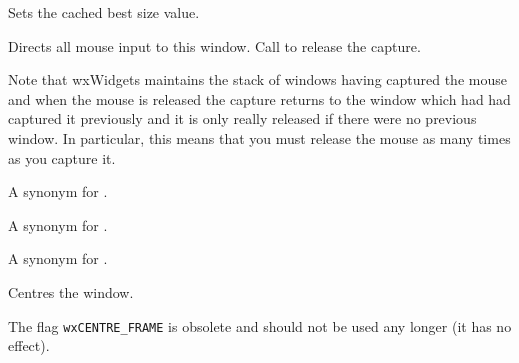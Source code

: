 
Sets the cached best size value.


\label{wxwindowcapturemouse}


Directs all mouse input to this window. Call  to
release the capture.

Note that wxWidgets maintains the stack of windows having captured the mouse
and when the mouse is released the capture returns to the window which had had
captured it previously and it is only really released if there were no previous
window. In particular, this means that you must release the mouse as many times
as you capture it.




\label{wxwindowcenter}


A synonym for .


\label{wxwindowcenteronparent}


A synonym for .


\label{wxwindowcenteronscreen}


A synonym for .


\label{wxwindowcentre}


Centres the window.



The flag {\tt wxCENTRE\_FRAME} is obsolete and should not be used any longer
(it has no effect).

